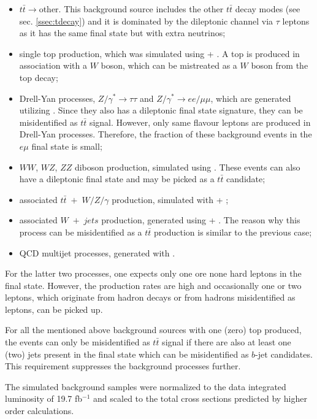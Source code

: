 \begin{itemize}
 \item $t\bar{t}\rightarrow$other. This background source includes the other $t\bar{t}$ decay modes (see sec. \ref{ssec:tdecay}) and it
 is dominated by the dileptonic channel via $\tau$ leptons as it has the same final state but with extra neutrinos;
 \item single top production, which was simulated using \Powheg + \PYTHIA. A top is produced in association with a $W$ boson, which can be 
 mistreated as a $W$ boson from the top decay;
 \item Drell-Yan processes, $Z/\gamma^{*} \rightarrow \tau\tau$ and $Z/\gamma^{*} \rightarrow ee/\mu\mu$, which are generated utilizing \PYTHIA. 
 Since they also has a dileptonic final state signature, they can be misidentified as $t\bar{t}$ signal. However, only same flavour leptons 
 are produced in Drell-Yan processes. Therefore, the fraction of these
 background events in the $e\mu$ final state is small;
 \item $WW$, $WZ$, $ZZ$ diboson production, simulated using \PYTHIA. These events can also have a dileptonic final state and may be 
 picked as a $t\bar{t}$ candidate;
 \item associated $t\bar{t}\;+\; W/Z/\gamma$ production, simulated with \MG + \PYTHIA;
 \item associated $W\;+\;jets$ production, generated using \MG + \PYTHIA. The reason why this process can be misidentified as a $t\bar{t}$
 production is similar to the previous case;
 \item QCD multijet processes, generated with \PYTHIA.
\end{itemize}
For the latter two processes, one expects only one ore none hard leptons in the final state. However, the production rates are high and 
occasionally one or two leptons, which originate from hadron decays or from hadrons misidentified as leptons, can be picked up.

For all the mentioned above background sources with one (zero) top produced, the events can only be misidentified as $t\bar{t}$ signal
if there are also at least one (two) jets present in the final state which can be misidentified as $b$-jet candidates. This requirement
suppresses the background processes further.

The simulated background samples were normalized to the data integrated luminosity of 19.7 fb$^{-1}$ and
scaled to the total cross sections predicted by higher order calculations\cite{TWikiXSec}.

